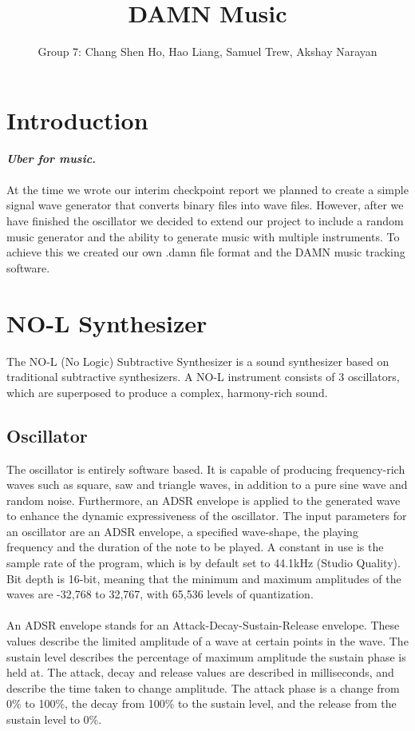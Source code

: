 \documentclass[11pt]{article}
\begin{document}
\title{DAMN Music}
\author{Group 7: Chang Shen Ho, Hao Liang, Samuel Trew, Akshay Narayan}

\maketitle

\section{Introduction}

\textit{\textbf{Uber for music.}}
\\\\
At the time we wrote our interim checkpoint report we planned to create a simple signal wave generator that converts binary files into wave files. However, after we have finished the oscillator we decided to extend our project to include a random music generator and the ability to generate music with multiple instruments. To achieve this we created our own .damn file format and the DAMN music tracking software.

\section{NO-L Synthesizer}
The NO-L (No Logic) Subtractive Synthesizer is a sound synthesizer based on traditional subtractive synthesizers. A NO-L instrument consists of 3 oscillators, which are superposed to produce a complex, harmony-rich sound.
\subsection{Oscillator}
The oscillator is entirely software based. It is capable of producing frequency-rich waves such as square, saw and triangle waves, in addition to a pure sine wave and random noise. Furthermore, an ADSR envelope is applied to the generated wave to enhance the dynamic expressiveness of the oscillator. The input parameters for an oscillator are an ADSR envelope, a specified wave-shape, the playing frequency and the duration of the note to be played. A constant in use is the sample rate of the program, which is by default set to 44.1kHz (Studio Quality). Bit depth is 16-bit, meaning that the minimum and maximum amplitudes of the waves are -32,768 to 32,767, with 65,536 levels of quantization. 
\\\\
An ADSR envelope stands for an Attack-Decay-Sustain-Release envelope. These values describe the limited amplitude of a wave at certain points in the wave. The sustain level describes the percentage of maximum amplitude the sustain phase is held at. The attack, decay and release values are described in milliseconds, and describe the time taken to change amplitude. The attack phase is a change from 0\% to 100\%, the decay from 100\% to the sustain level, and the release from the sustain level to 0\%.
\end{document}

